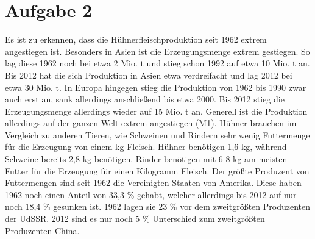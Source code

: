 \documentclass[11pt,a4paper]{report}
\begin{document}
	\chapter{Aufgabe 2}
	Es ist zu erkennen, dass die Hühnerfleischproduktion seit 1962 extrem angestiegen ist.
	Besonders in Asien ist die Erzeugungsmenge extrem gestiegen.
	So lag diese 1962 noch bei etwa 2 Mio. t und stieg schon 1992 auf etwa 10 Mio. t an.
	Bis 2012 hat die sich Produktion in Asien etwa verdreifacht und lag 2012 bei etwa 30 Mio. t.
	In Europa hingegen stieg die Produktion von 1962 bis 1990 zwar auch erst an, sank allerdings anschließend bis etwa 2000.
	Bis 2012 stieg die Erzeugungsmenge allerdings wieder auf 15 Mio. t an.
	Generell ist die Produktion allerdings auf der ganzen Welt extrem angestiegen (M1).
	Hühner brauchen im Vergleich zu anderen Tieren, wie Schweinen und Rindern sehr wenig Futtermenge für die Erzeugung von einem kg Fleisch.
	Hühner benötigen 1,6 kg, während Schweine bereits 2,8 kg benötigen.
	Rinder benötigen mit 6-8 kg am meisten Futter für die Erzeugung für einen Kilogramm Fleisch.
	Der größte Produzent von Futtermengen sind seit 1962 die Vereinigten Staaten von Amerika.
	Diese haben 1962 noch einen Anteil von 33,3 \% gehabt, welcher allerdings bis 2012 auf nur noch 18,4 \% gesunken ist.
	1962 lagen sie 23 \% vor dem zweitgrößten Produzenten der UdSSR.
	2012 sind es nur noch 5 \% Unterschied zum zweitgrößten Produzenten China.
\end{document}
